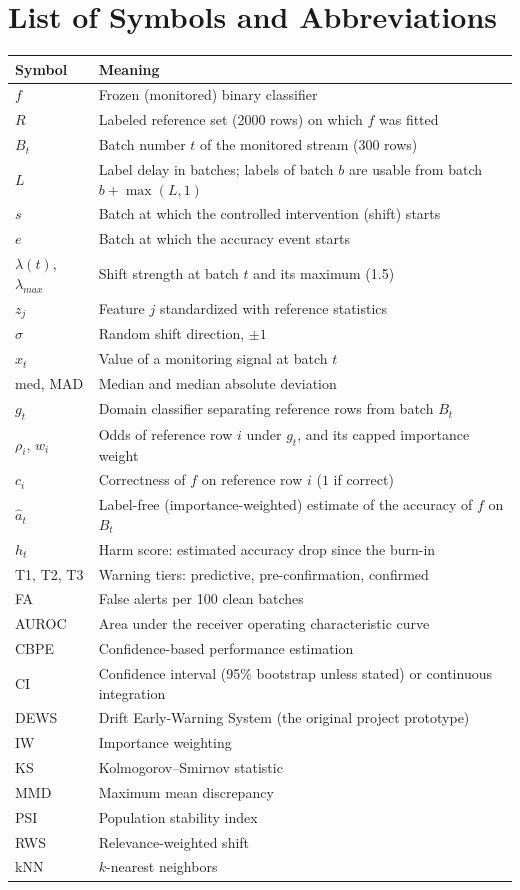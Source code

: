 \chapter*{List of Symbols and Abbreviations}

\begin{longtable}{@{}p{3.2cm}p{11.8cm}@{}}
\toprule
\textbf{Symbol} & \textbf{Meaning} \\
\midrule
\endhead
$f$ & Frozen (monitored) binary classifier \\
$R$ & Labeled reference set (2000 rows) on which $f$ was fitted \\
$B_t$ & Batch number $t$ of the monitored stream (300 rows) \\
$L$ & Label delay in batches; labels of batch $b$ are usable from batch $b+\max(L,1)$ \\
$s$ & Batch at which the controlled intervention (shift) starts \\
$e$ & Batch at which the accuracy event starts \\
$\lambda(t)$, $\lambda_{max}$ & Shift strength at batch $t$ and its maximum (1.5) \\
$z_j$ & Feature $j$ standardized with reference statistics \\
$\sigma$ & Random shift direction, $\pm 1$ \\
$x_t$ & Value of a monitoring signal at batch $t$ \\
$\mathrm{med}$, $\mathrm{MAD}$ & Median and median absolute deviation \\
$g_t$ & Domain classifier separating reference rows from batch $B_t$ \\
$\rho_i$, $w_i$ & Odds of reference row $i$ under $g_t$, and its capped importance weight \\
$c_i$ & Correctness of $f$ on reference row $i$ ($1$ if correct) \\
$\hat a_t$ & Label-free (importance-weighted) estimate of the accuracy of $f$ on $B_t$ \\
$h_t$ & Harm score: estimated accuracy drop since the burn-in \\
T1, T2, T3 & Warning tiers: predictive, pre-confirmation, confirmed \\
FA & False alerts per 100 clean batches \\
\midrule
AUROC & Area under the receiver operating characteristic curve \\
CBPE & Confidence-based performance estimation \\
CI & Confidence interval (95\% bootstrap unless stated) or continuous integration \\
DEWS & Drift Early-Warning System (the original project prototype) \\
IW & Importance weighting \\
KS & Kolmogorov--Smirnov statistic \\
MMD & Maximum mean discrepancy \\
PSI & Population stability index \\
RWS & Relevance-weighted shift \\
kNN & $k$-nearest neighbors \\
\bottomrule
\end{longtable}
